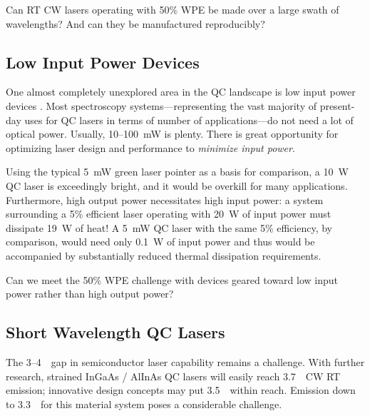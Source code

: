 \medskip

\noindent
{} \quad  Can RT CW lasers operating with 50\% WPE be made over a large swath of wavelengths? And can they be manufactured reproducibly?





\subsection{Low Input Power Devices}
One almost completely unexplored area in the QC landscape is low input power devices \cite{Blaser:ElecLett:2007} \cite{Liu:CLEO:2008}.  Most spectroscopy systems---representing the vast majority of present-day uses for QC lasers in terms of number of applications---do not need a lot of optical power.  Usually, 10--100~mW is plenty.  There is great opportunity for optimizing laser design and performance to \emph{minimize input power}.

Using the typical 5~mW green laser pointer as a basis for comparison, a 10~W QC laser is exceedingly bright, and it would be overkill for many applications.  Furthermore, high output power necessitates high input power: a system surrounding a 5\% efficient laser operating with 20~W of input power must dissipate 19~W of heat!  A 5~mW QC laser with the same 5\% efficiency, by comparison, would need only 0.1~W of input power and thus would be accompanied by substantially reduced thermal dissipation requirements.

\medskip

\noindent
{} \quad  Can we meet the 50\% WPE challenge with devices geared toward low input power rather than high output power?



\subsection{Short Wavelength QC Lasers}
The 3--4~\um\ gap in semiconductor laser capability remains a challenge.  With further research, strained InGaAs / AlInAs QC lasers will easily reach 3.7~\um\ CW RT emission; innovative design concepts may put 3.5~\um\ within reach.  Emission down to 3.3~\um\ for this material system poses a considerable challenge.

